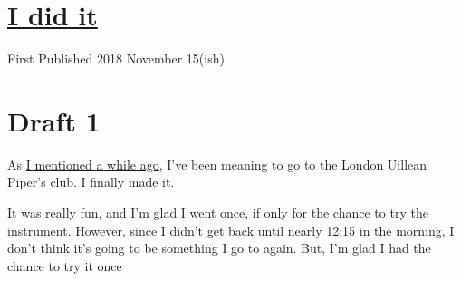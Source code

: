 \documentclass[12pt]{article}[titlepage]
\newcommand{\1}{\={a}}
\newcommand{\2}{\={e}}
\newcommand{\3}{\={\i}}
\newcommand{\4}{\=o}
\newcommand{\5}{\=u}
\newcommand{\6}{\={A}}
\renewcommand{\,}{\textsuperscript{,}}
\begin{document}
\doublespacing
\section{\href{did-it.html}{I did it}}
First Published 2018 November 15(ish)
\section{Draft 1}
As \href{will-he-or-wont-he.html}{I mentioned a while ago}, I've been meaning to go to the London Uillean Piper's club.
I finally made it.

It was really fun, and I'm glad I went once, if only for the chance to try the instrument.
However, since I didn't get back until nearly 12:15 in the morning, I don't think it's going to be something I go to again.
But, I'm glad I had the chance to try it once
\end{document}
